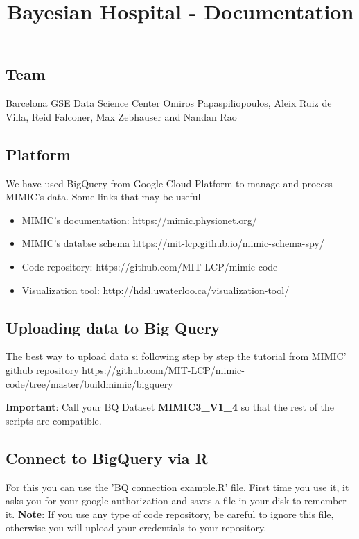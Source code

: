 \documentclass[12pt]{article}
\begin{document}
\def\moveover{\hskip 4.2 true in}
\date{}
\title{Bayesian Hospital - Documentation}

\maketitle
\subsection*{Team}
Barcelona GSE Data Science Center
Omiros Papaspiliopoulos, Aleix Ruiz de Villa, Reid Falconer, Max Zebhauser and Nandan Rao
\subsection*{Platform}

We have used BigQuery from Google Cloud Platform to manage and process MIMIC's data. Some links that may be useful

\begin{itemize}
	\item MIMIC's documentation: https://mimic.physionet.org/
	\item MIMIC's databse schema https://mit-lcp.github.io/mimic-schema-spy/
	\item Code repository: https://github.com/MIT-LCP/mimic-code
	\item Visualization tool: http://hdsl.uwaterloo.ca/visualization-tool/
\end{itemize}

\subsection*{Uploading data to Big Query}

The best way to upload data si following step by step the tutorial from MIMIC' github repository 
https://github.com/MIT-LCP/mimic-code/tree/master/buildmimic/bigquery

\textbf{Important}: Call your BQ Dataset \textbf{MIMIC3\_V1\_4} so that the rest of the scripts are compatible.

\subsection*{Connect to BigQuery via R}

For this you can use the 'BQ connection example.R' file. First time you use it, it asks you for your google authorization and saves a file in your disk to remember it. \textbf{Note}: If you use any type of code repository, be careful to ignore this file, otherwise you will upload your credentials to your repository. 
\end{document}
